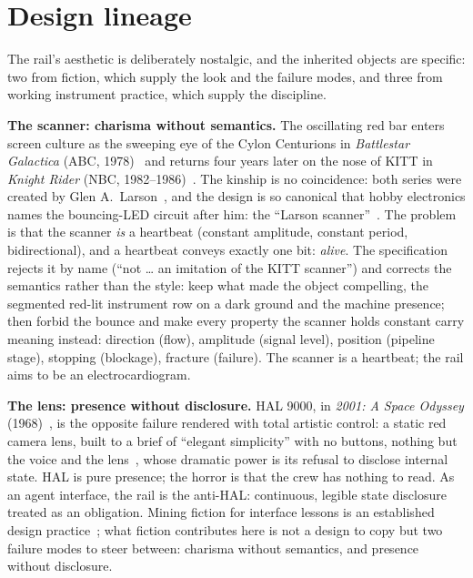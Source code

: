 \documentclass[11pt]{article}
\begin{document}
\section{Design lineage}
\label{sec:lineage}

The rail's aesthetic is deliberately nostalgic, and the inherited
objects are specific: two from fiction, which supply the look and the
failure modes, and three from working instrument practice, which supply
the discipline.

\textbf{The scanner: charisma without semantics.} The oscillating red
bar enters screen culture as the sweeping eye of the Cylon Centurions in
\emph{Battlestar Galactica} (ABC, 1978)~\cite{bsg1978} and returns four
years later on the nose of KITT in \emph{Knight Rider} (NBC,
1982--1986)~\cite{knightrider}. The kinship is no coincidence: both series were created by
Glen A.\ Larson~\cite{bsg1978,knightrider}, and the design is so
canonical that hobby electronics names the bouncing-LED circuit after
him: the ``Larson scanner''~\cite{larsonscanner}. The problem is that the scanner \emph{is} a heartbeat (constant amplitude, constant period, bidirectional), and a heartbeat conveys exactly one
bit: \emph{alive}. The specification
rejects it by name (``not \ldots{} an imitation of the KITT scanner'')
and corrects the semantics rather than the style: keep what made the object compelling, the segmented red-lit instrument row on a dark ground and the machine presence; then forbid the bounce and make every
property the scanner holds constant carry meaning instead: direction
(flow), amplitude (signal level), position (pipeline stage), stopping
(blockage), fracture (failure). The scanner is a heartbeat; the rail
aims to be an electrocardiogram.

\textbf{The lens: presence without disclosure.} HAL 9000, in
\emph{2001: A Space Odyssey} (1968)~\cite{kubrick1968}, is the opposite
failure rendered with total artistic control: a static red camera lens, built to a brief of ``elegant simplicity'' with no buttons, nothing but the voice and the lens~\cite{epstein2017}, whose dramatic power is its refusal to disclose internal state. HAL is pure presence;
the horror is that the crew has nothing to read. As an agent interface,
the rail is the anti-HAL: continuous, legible state disclosure treated
as an obligation. Mining fiction for interface lessons is an
established design practice~\cite{shedroff2012,schmitz2008}; what
fiction contributes here is not a design to copy but two failure modes to steer between: charisma without semantics, and presence without disclosure.
\end{document}
